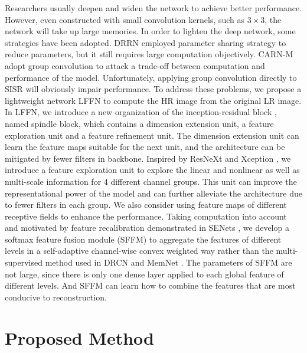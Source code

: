 \documentclass[journal]{IEEEtran}
\begin{document}
\par Researchers usually deepen and widen the network to achieve better performance. However, even constructed with small convolution kernels, such as $3 \times 3$, the network will take up large memories. In order to lighten the deep network, some strategies have been adopted. DRRN \cite{tai2017image} employed parameter sharing strategy to reduce parameters, but it still requires large computation objectively. CARN-M \cite{ahn2018fast} adopt group convolution to attack a trade-off between computation and performance of the model. Unfortunately, applying group convolution directly to SISR will obviously impair performance. To address these problems, we propose a lightweight network LFFN to compute the HR image from the original LR image. In LFFN, we introduce a new organization of the inception-residual block \cite{szegedy2017inception}, named spindle block, which contains a dimension extension unit, a feature exploration unit and a feature refinement unit. The dimension extension unit can learn the feature maps suitable for the next unit, and the architecture can be mitigated by fewer filters in backbone. Inspired by ResNeXt \cite{xie2017aggregated} and Xception \cite{chollet2017xception}, we introduce a feature exploration unit to explore the linear and nonlinear as well as multi-scale information for 4 different channel groups. This unit can improve the representational power of the model and can further alleviate the architecture due to fewer filters in each group. We also consider using feature maps of different receptive fields to enhance the performance. Taking computation into account and motivated by feature recalibration demonstrated in SENets \cite{hu2017squeeze}, we develop a softmax feature fusion module (SFFM) to aggregate the features of different levels in a self-adaptive channel-wise convex weighted way rather than the multi-supervised method used in DRCN\cite{kim2016deeply} and MemNet \cite{tai2017memnet}. The parameters of SFFM are not large, since there is only one dense layer applied to each global feature of different levels. And SFFM can learn how to combine the features that are most conducive to reconstruction.
\section{Proposed Method}
\end{document}
